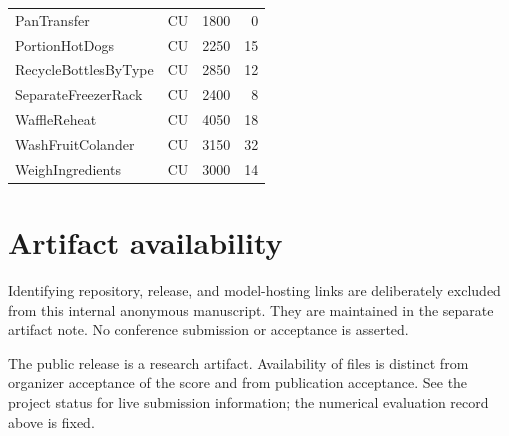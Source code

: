 \documentclass[10pt,twocolumn,letterpaper]{article}
\begin{document}
\begin{longtable}{@{}p{}rrr@{}}
PanTransfer & CU & 1800 & 0\\

PortionHotDogs & CU & 2250 & 15\\

RecycleBottlesByType & CU & 2850 & 12\\

SeparateFreezerRack & CU & 2400 & 8\\

WaffleReheat & CU & 4050 & 18\\

WashFruitColander & CU & 3150 & 32\\

WeighIngredients & CU & 3000 & 14\\

\bottomrule\end{longtable}\normalsize

\section{Artifact availability}

Identifying repository, release, and model-hosting links are deliberately excluded from this internal anonymous manuscript. They are maintained in the separate artifact note. No conference submission or acceptance is asserted.


The public release is a research artifact. Availability of files is distinct from organizer acceptance of the score and from publication acceptance. See the project status for live submission information; the numerical evaluation record above is fixed.
\end{document}
